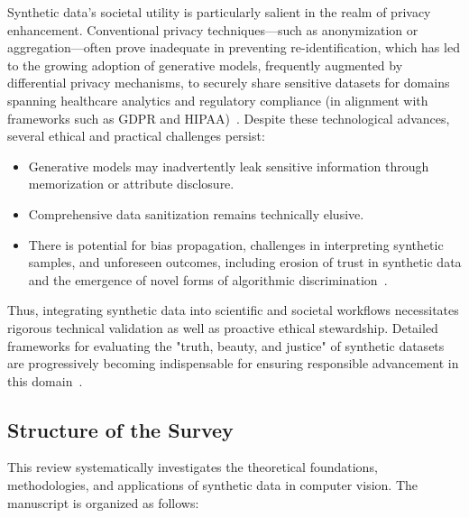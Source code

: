 \documentclass[sigconf]{acmart}
\begin{document}
Synthetic data’s societal utility is particularly salient in the realm of privacy enhancement. Conventional privacy techniques—such as anonymization or aggregation—often prove inadequate in preventing re-identification, which has led to the growing adoption of generative models, frequently augmented by differential privacy mechanisms, to securely share sensitive datasets for domains spanning healthcare analytics and regulatory compliance (in alignment with frameworks such as GDPR and HIPAA)~\cite{ref5,ref6,ref12,ref13}. Despite these technological advances, several ethical and practical challenges persist:

\begin{itemize}
    \item Generative models may inadvertently leak sensitive information through memorization or attribute disclosure.
    \item Comprehensive data sanitization remains technically elusive.
    \item There is potential for bias propagation, challenges in interpreting synthetic samples, and unforeseen outcomes, including erosion of trust in synthetic data and the emergence of novel forms of algorithmic discrimination~\cite{ref12,ref35,ref87}.
\end{itemize}

Thus, integrating synthetic data into scientific and societal workflows necessitates rigorous technical validation as well as proactive ethical stewardship. Detailed frameworks for evaluating the "truth, beauty, and justice" of synthetic datasets are progressively becoming indispensable for ensuring responsible advancement in this domain~\cite{ref14,ref87}.

\subsection{Structure of the Survey}

This review systematically investigates the theoretical foundations, methodologies, and applications of synthetic data in computer vision. The manuscript is organized as follows:
\end{document}
